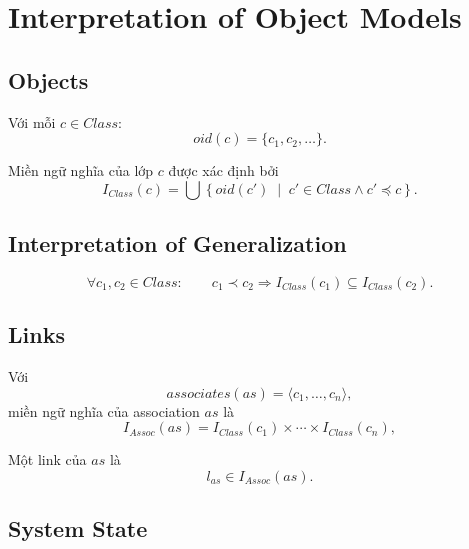 \documentclass[12pt,a4paper]{article}
\theoremstyle{definition}
\begin{document}
\section{Interpretation of Object Models}

\subsection{Objects}

Với mỗi $c\in Class$:
\[
oid(c)=\{c_1,c_2,\ldots\}.
\]

Miền ngữ nghĩa của lớp $c$ được xác định bởi
\[
I_{Class}(c)
=
\bigcup
\left\{
oid(c')
\;\middle|\;
c'\in Class \land c'\preceq c
\right\}.
\]

\subsection{Interpretation of Generalization}

\[
\forall c_1,c_2\in Class:
\qquad
c_1\prec c_2
\Longrightarrow
I_{Class}(c_1)\subseteq I_{Class}(c_2).
\]


\subsection{Links}

Với
\[
associates(as)=\langle c_1,\ldots,c_n\rangle,
\]
miền ngữ nghĩa của association $as$ là
\[
I_{Assoc}(as)
=
I_{Class}(c_1)\times\cdots\times I_{Class}(c_n),
\]

Một link của $as$ là
\[
l_{as}\in I_{Assoc}(as).
\]



\subsection{System State}
\end{document}
